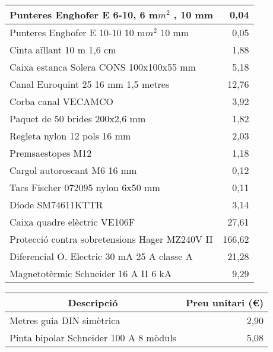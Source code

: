 \begin{table}[H]
\begin{center}
\begin{tabularx} {\textwidth} {|X|r|}
    Punteres Enghofer E 6-10, 6 m$m^2$  , 10 mm & 0,04 \\ \hline
    Punteres Enghofer E 10-10 10 m$m^2$   10 mm & 0,05 \\ \hline
    Cinta aïllant 10 m 1,6 cm & 1,88 \\ \hline
    Caixa estanca Solera CONS 100x100x55 mm & 5,18 \\ \hline
    Canal Euroquint 25 16 mm 1,5 metres & 12,76 \\ \hline
    Corba canal VECAMCO & 3,92 \\ \hline
    Paquet de 50 brides 200x2,6  mm & 1,82 \\ \hline
    Regleta nylon 12 pols 16 mm & 2,03 \\ \hline
    Premsaestopes M12 & 1,18 \\ \hline
    Cargol autoroscant M6 16 mm & 0,12 \\ \hline
    Tacs Fischer 072095 nylon 6x50 mm & 0,11 \\ \hline
    Díode SM74611KTTR & 3,14 \\ \hline
    Caixa quadre elèctric VE106F & 27,61 \\ \hline
    Protecció contra sobretensions Hager MZ240V II & 166,62 \\ \hline
    Diferencial O. Electric 30 mA 25 A classe A & 21,28 \\ \hline
    Magnetotèrmic Schneider 16 A II 6 kA & 9,29 \\ \hline

    \end{tabularx}%
  \end{center}

  \label{tab:addlabel}%
\end{table}%


\begin{table}[H]
  \begin{center}
    \begin{tabularx} {\textwidth} {|X|r|} \hline
      \multicolumn{1}{|c|}{Descripció} &  \multicolumn{1}{c|}{Preu unitari (€)}\\ \hline \hline

    Metres guia DIN simètrica & 2,90 \\ \hline
    Pinta bipolar Schneider 100 A 8 mòduls & 5,08 \\ \hline
    \end{tabularx}%
  \end{center}

  \label{tab:addlabel}%
\end{table}%

